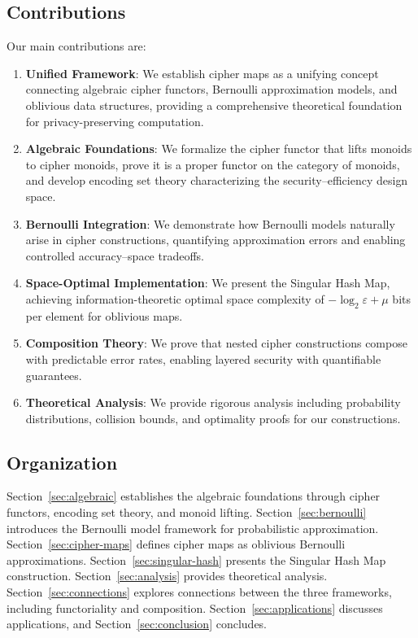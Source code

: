 \documentclass[11pt]{article}
\theoremstyle{definition}
\theoremstyle{plain}
\theoremstyle{remark}
\begin{document}
\subsection{Contributions}

Our main contributions are:

\begin{enumerate}
\item \textbf{Unified Framework}: We establish cipher maps as a unifying concept connecting algebraic cipher functors, Bernoulli approximation models, and oblivious data structures, providing a comprehensive theoretical foundation for privacy-preserving computation.

\item \textbf{Algebraic Foundations}: We formalize the cipher functor that lifts monoids to cipher monoids, prove it is a proper functor on the category of monoids, and develop encoding set theory characterizing the security--efficiency design space.

\item \textbf{Bernoulli Integration}: We demonstrate how Bernoulli models naturally arise in cipher constructions, quantifying approximation errors and enabling controlled accuracy--space tradeoffs.

\item \textbf{Space-Optimal Implementation}: We present the Singular Hash Map, achieving information-theoretic optimal space complexity of $-\log_2 \varepsilon + \mu$ bits per element for oblivious maps.

\item \textbf{Composition Theory}: We prove that nested cipher constructions compose with predictable error rates, enabling layered security with quantifiable guarantees.

\item \textbf{Theoretical Analysis}: We provide rigorous analysis including probability distributions, collision bounds, and optimality proofs for our constructions.
\end{enumerate}

\subsection{Organization}

Section~\ref{sec:algebraic} establishes the algebraic foundations through cipher functors, encoding set theory, and monoid lifting. Section~\ref{sec:bernoulli} introduces the Bernoulli model framework for probabilistic approximation. Section~\ref{sec:cipher-maps} defines cipher maps as oblivious Bernoulli approximations. Section~\ref{sec:singular-hash} presents the Singular Hash Map construction. Section~\ref{sec:analysis} provides theoretical analysis. Section~\ref{sec:connections} explores connections between the three frameworks, including functoriality and composition. Section~\ref{sec:applications} discusses applications, and Section~\ref{sec:conclusion} concludes.
\end{document}
